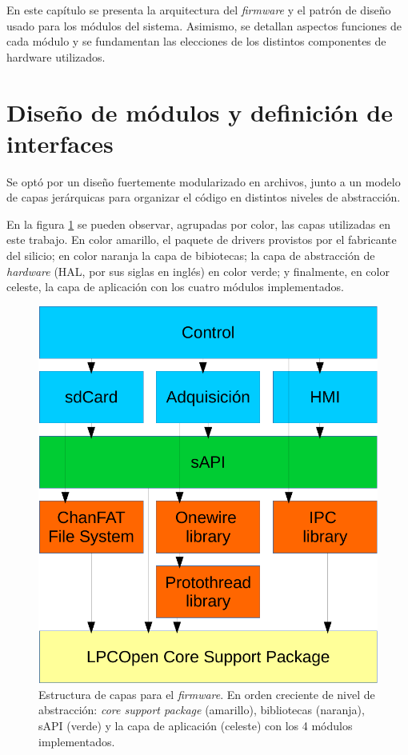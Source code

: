 En este capítulo se presenta la arquitectura del \textit{firmware} y el patrón de diseño usado para los módulos del sistema.  Asimismo, se detallan aspectos funciones de cada módulo y se fundamentan las elecciones de los distintos componentes de hardware utilizados.

\section{Diseño de módulos y definición de interfaces}
\label{sec:modulos}

Se optó por un diseño fuertemente modularizado en archivos, junto a un modelo de capas jerárquicas para organizar el código en distintos niveles de abstracción.

En la figura \ref{fig:capas} se pueden observar, agrupadas por color, las capas utilizadas en este trabajo.  En color amarillo, el paquete de drivers provistos por el fabricante del silicio; en color naranja la capa de bibiotecas; la capa de abstracción de \textit{hardware} (HAL, por sus siglas en inglés) en color verde; y finalmente, en color celeste, la capa de aplicación con los cuatro módulos implementados.


\begin{figure}[ht]
	\centering
	\includegraphics[width=.55\textwidth]{./Figures/capas.pdf}
	\caption[Estructura de capas para el \textit{firmware}.]{Estructura de capas para el \textit{firmware}. En orden creciente de nivel de abstracción: \textit{core support package} (amarillo), bibliotecas (naranja), sAPI (verde) y la capa de aplicación (celeste) con los 4 módulos implementados.}
	\label{fig:capas}
\end{figure}

